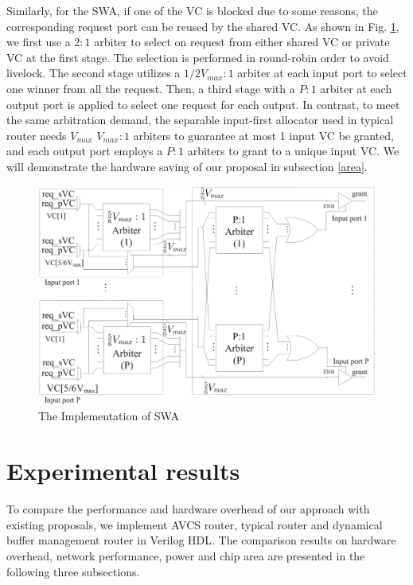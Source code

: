 \documentclass[paper]{ieice}
\begin{document}
Similarly, for the SWA, if one of the VC is blocked due to some reasons, the corresponding request port can be reused by the shared VC. As shown in Fig. \ref{swallocator}, we first use a $2:1$ arbiter to select on request from either shared VC or private VC at the first stage. The selection is performed in round-robin order to avoid livelock. The second stage utilizes a $1/2V_{max}:1$ arbiter at each input port to select one winner from all the request. Then, a third stage with a $P:1$ arbiter at each output port is applied to select one request for each output. In contrast, to meet the same arbitration demand, the separable input-first allocator used in typical router needs $V_{max}$ $V_{max}:1$ arbiters to guarantee at most 1 input VC be granted, and each output port employs a $P:1$ arbiters to grant to a unique input VC. We will demonstrate the hardware saving of our proposal in subsection \ref{area}.
\begin{figure}[h]
\centering\includegraphics[scale=0.29]{figures/swalloc.eps}
\caption{The Implementation of SWA}\label{swallocator}
\end{figure}

\section{Experimental results}\label{experiemnts}
To compare the performance and hardware overhead of our approach with existing proposals, we implement AVCS router, typical router \cite{DaTo01} and dynamical buffer management router \cite{NPKV06}\cite{4555894} in Verilog HDL. The comparison results on hardware overhead, network performance, power and chip area are presented in the following three subsections.
\end{document}
